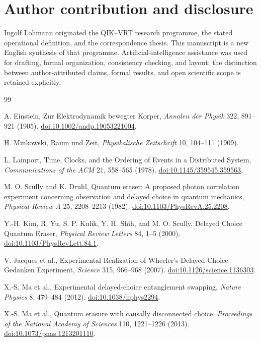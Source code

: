 \documentclass[11pt]{article}
\theoremstyle{remark}
\begin{document}
\section*{Author contribution and disclosure}

Ingolf Lohmann originated the QIK--VRT research programme, the stated
operational definition, and the correspondence thesis. This manuscript is a
new English synthesis of that programme. Artificial-intelligence assistance
was used for drafting, formal organization, consistency checking, and layout;
the distinction between author-attributed claims, formal results, and open
scientific scope is retained explicitly.

\begin{thebibliography}{99}

A. Einstein, Zur Elektrodynamik bewegter Korper, \emph{Annalen der
Physik} 322, 891--921 (1905).
\href{https://doi.org/10.1002/andp.19053221004}{doi:10.1002/andp.19053221004}.

H. Minkowski, Raum und Zeit, \emph{Physikalische Zeitschrift} 10,
104--111 (1909).

L. Lamport, Time, Clocks, and the Ordering of Events in a Distributed
System, \emph{Communications of the ACM} 21, 558--565 (1978).
\href{https://doi.org/10.1145/359545.359563}{doi:10.1145/359545.359563}.

M. O. Scully and K. Druhl, Quantum eraser: A proposed photon correlation
experiment concerning observation and delayed choice in quantum mechanics,
\emph{Physical Review A} 25, 2208--2213 (1982).
\href{https://doi.org/10.1103/PhysRevA.25.2208}{doi:10.1103/PhysRevA.25.2208}.

Y.-H. Kim, R. Yu, S. P. Kulik, Y. H. Shih, and M. O. Scully, Delayed
Choice Quantum Eraser, \emph{Physical Review Letters} 84, 1--5 (2000).
\href{https://doi.org/10.1103/PhysRevLett.84.1}{doi:10.1103/PhysRevLett.84.1}.

V. Jacques et al., Experimental Realization of Wheeler's Delayed-Choice
Gedanken Experiment, \emph{Science} 315, 966--968 (2007).
\href{https://doi.org/10.1126/science.1136303}{doi:10.1126/science.1136303}.

X.-S. Ma et al., Experimental delayed-choice entanglement swapping,
\emph{Nature Physics} 8, 479--484 (2012).
\href{https://doi.org/10.1038/nphys2294}{doi:10.1038/nphys2294}.

X.-S. Ma et al., Quantum erasure with causally disconnected choice,
\emph{Proceedings of the National Academy of Sciences} 110, 1221--1226
(2013). \href{https://doi.org/10.1073/pnas.1213201110}{doi:10.1073/pnas.1213201110}.


\end{thebibliography}
\end{document}
